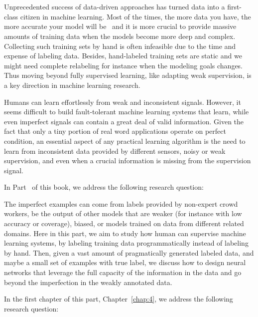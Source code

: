 \part{}
\label{part2}
Unprecedented success of data-driven approaches has turned data into a first-class citizen in machine learning. Most of the times, the more data you have, the more accurate your model will be~\citep{halevy2009unreasonable,sun2017revisiting} and it is more crucial to provide massive amounts of training data when the models become more deep and complex.
Collecting such training sets by hand is often infeasible due to the time and expense of labeling data. Besides, hand-labeled training sets are static and we might need complete relabeling for instance when the modeling goals changes. Thus moving beyond fully supervised learning, like adapting weak supervision, is a key direction in machine learning research.  

Humans can learn effortlessly from weak and inconsistent signals. However, it seems difficult to build fault-tolerant machine learning systems that learn, while even imperfect signals can contain a great deal of valid information.
Given the fact that only a tiny portion of real word applications operate on perfect condition, an essential aspect of any practical learning algorithm is the need to learn from inconsistent data provided by different sensors, noisy or weak supervision, and even when a crucial information is missing from the supervision signal.

In Part~\ref{part2} of this book, we address the following research question:

The imperfect examples can come from labels provided by non-expert crowd workers, be the output of other models that are weaker (for instance with low accuracy or coverage), biased, or models trained on data from different related domains. 
Here in this part, we aim to study how human can supervise machine learning systems, by labeling training data programmatically instead of labeling by hand. Then, given a vast amount of pragmatically generated labeled data, and maybe a small set of examples with true label,  we discuss how to design neural networks that leverage the full capacity of the information in the data and go beyond the imperfection in the weakly annotated data.


In the first chapter of this part, Chapter~\ref{chap:4}, we address the following research question:

